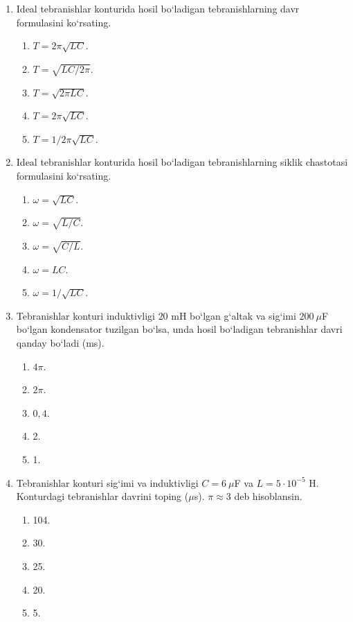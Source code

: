 \begin{enumerate}

\item Ideal tebranishlar konturida hosil bo‘ladigan tebranishlarning davr formulasini ko‘rsating.
\begin{enumerate}[label=\Alph*)]
\item $T=2\pi\sqrt{LC}$.
\item $T=\sqrt{LC/2\pi}$.
\item $T=\sqrt{2\pi LC}$.
\item $T=2\pi\sqrt{LC}$.
\item $T=1/2\pi\sqrt{LC}$.
\end{enumerate}

\item Ideal tebranishlar konturida hosil bo‘ladigan tebranishlarning siklik chastotasi formulasini ko‘rsating.
\begin{enumerate}[label=\Alph*)]
\item $\omega=\sqrt{LC}$.
\item $\omega=\sqrt{L/C}$.
\item $\omega=\sqrt{C/L}$.
\item $\omega=LC$.
\item $\omega=1/\sqrt{LC}$.
\end{enumerate}

\item Tebranishlar konturi induktivligi $20$ mH bo‘lgan g‘altak va sig‘imi $200~\mu$F bo‘lgan kondensator tuzilgan bo‘lsa, unda hosil bo‘ladigan tebranishlar davri qanday bo‘ladi (ms).
\begin{enumerate}[label=\Alph*)]
\item $4\pi$.
\item $2\pi$.
\item $0,4$.
\item 2.
\item 1.
\end{enumerate}

\item Tebranishlar konturi sig‘imi va induktivligi $C=6~\mu$F va $L=5\cdot10^{-5}$ H. Konturdagi tebranishlar davrini toping ($\mu$s). $\pi\approx3$ deb hisoblansin.
\begin{enumerate}[label=\Alph*)]
\item 104.
\item 30.
\item 25.
\item 20.
\item 5.
\end{enumerate}


\end{enumerate}
